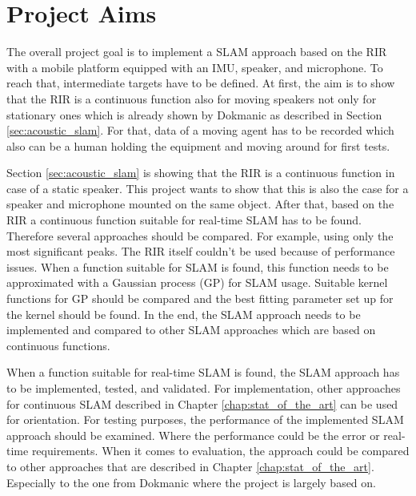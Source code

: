 \section{Project Aims}

The overall project goal is to implement a SLAM approach based on the RIR with a mobile platform equipped with an IMU, speaker, and microphone. To reach that, intermediate targets have to be defined. At first, the aim is to show that the RIR is a continuous function also for moving speakers not only for stationary ones which is already shown by Dokmanic \cite{dokmanic_roomrecslam_2016} as described in Section \ref{sec:acoustic_slam}. For that, data of a moving agent has to be recorded which also can be a human holding the equipment and moving around for first tests. 

Section \ref{sec:acoustic_slam} is showing that the RIR is a continuous function in case of a static speaker. This project wants to show that this is also the case for a speaker and microphone mounted on the same object. After that, based on the RIR a continuous function suitable for real-time SLAM has to be found. Therefore several approaches should be compared. For example, using only the most significant peaks. The RIR itself couldn't be used because of performance issues. When a function suitable for SLAM is found, this function needs to be approximated with a Gaussian process (GP) for SLAM usage. Suitable kernel functions for GP should be compared and the best fitting parameter set up for the kernel should be found. In the end, the SLAM approach needs to be implemented and compared to other SLAM approaches which are based on continuous functions.

When a function suitable for real-time SLAM is found, the SLAM approach has to be implemented, tested, and validated. For implementation, other approaches for continuous SLAM described in Chapter \ref{chap:stat_of_the_art} can be used for orientation. For testing purposes, the performance of the implemented SLAM approach should be examined. Where the performance could be the error or real-time requirements. When it comes to evaluation, the approach could be compared to other approaches that are described in Chapter \ref{chap:stat_of_the_art}. Especially to the one from Dokmanic \cite{dokmanic_roomrecslam_2016} where the project is largely based on.